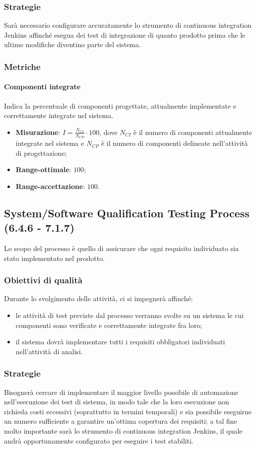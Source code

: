 \subsubsection{Strategie}
Sarà necessario configurare accuratamente lo strumento di continuous integration Jenkins affinché esegua dei test di integrazione di quanto prodotto prima che le ultime modifiche diventino parte del sistema.
\subsubsection{Metriche}
\paragraph{Componenti integrate}
Indica la percentuale di componenti progettate, attualmente implementate e correttamente integrate nel sistema.
\begin{itemize}
\item \textbf{Misurazione}: $I=\frac{N_{CI}}{N_{CP}} \cdot 100$, dove $N_{CI}$ è il numero di componenti attualmente integrate nel sistema e $N_{CP}$ è il numero di componenti delineate nell'attività di progettazione;
\item \textbf{Range-ottimale}: $100$;
\item \textbf{Range-accettazione}: $100$.
\end{itemize}

\subsection{System/Software Qualification Testing Process (6.4.6 - 7.1.7)}
Lo scopo del processo è quello di assicurare che ogni requisito individuato sia stato implementato nel prodotto.
\subsubsection{Obiettivi di qualità}
Durante lo svolgimento delle attività, ci si impegnerà affinché:
\begin{itemize}
\item le attività di test previste dal processo verranno svolte su un sistema le cui componenti sono verificate e correttamente integrate fra loro;
\item il sistema dovrà implementare tutti i requisiti obbligatori individuati nell'attività di analisi.
\end{itemize}
\subsubsection{Strategie}
Bisognerà cercare di implementare il maggior livello possibile di automazione nell'esecuzione dei test di sistema, in modo tale che la loro esecuzione non richieda costi eccessivi (soprattutto in termini temporali) e sia possibile eseguirne un numero sufficiente a garantire un'ottima copertura dei requisiti; a tal fine molto importante sarà lo strumento di continuous integration Jenkins, il quale andrà opportunamente configurato per eseguire i test stabiliti.
